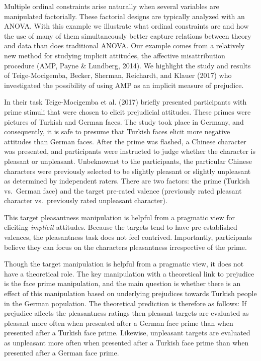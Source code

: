 \documentclass[english,,man]{apa6}
\begin{document}
Multiple ordinal constraints arise naturally when several variables are manipulated factorially. These factorial designs are typically analyzed with an ANOVA. With this example we illustrate what ordinal constraints are and how the use of many of them simultaneously better capture relations between theory and data than does traditional ANOVA. Our example comes from a relatively new method for studying implicit attitudes, the affective misattribution procedure (AMP, Payne \& Lundberg, 2014). We highlight the study and results of Teige-Mocigemba, Becker, Sherman, Reichardt, and Klauer (2017) who investigated the possibility of using AMP as an implicit measure of prejudice.

In their task Teige-Mocigemba et al. (2017) briefly presented participants with prime stimuli that were chosen to elicit prejudicial attitudes.
These primes were pictures of Turkish and German faces. The study took place in Germany, and consequently, it is safe to presume that Turkish faces elicit more negative attitudes than German faces. After the prime was flashed, a Chinese character was presented, and participants were instructed to judge whether the character is pleasant or unpleasant. Unbeknownst to the participants, the particular Chinese characters were previously selected to be slightly pleasant or slightly unpleasant as determined by independent raters. There are two factors: the prime (Turkish vs.~German face) and the target pre-rated valence (previously rated pleasant character vs.~previously rated unpleasant character).

This target pleasantness manipulation is helpful from a pragmatic view for eliciting \emph{implicit} attitudes. Because the targets tend to have pre-established valences, the pleasantness task does not feel contrived. Importantly, participants believe they can focus on the characters pleasantness irrespective of the prime.

Though the target manipulation is helpful from a pragmatic view, it does not have a theoretical role. The key manipulation with a theoretical link to prejudice is the face prime manipulation, and the main question is whether there is an effect of this manipulation based on underlying prejudices towards Turkish people in the German population.
The theoretical prediction is therefore as follows: If prejudice affects the pleasantness ratings then pleasant targets are evaluated as pleasant more often when presented after a German face prime than when presented after a Turkish face prime. Likewise, unpleasant targets are evaluated as unpleasant more often when presented after a Turkish face prime than when presented after a German face prime.
\end{document}

